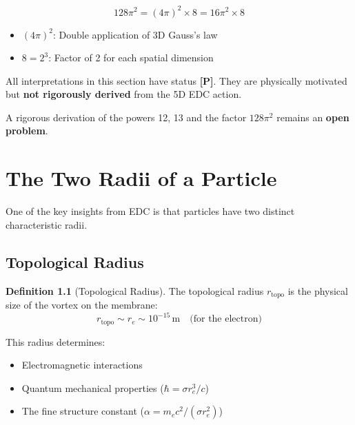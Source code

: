 \documentclass[12pt,a4paper,openany]{book}
\theoremstyle{definition}
\newtheorem{definition}{Definition}[chapter]
\theoremstyle{plain}
\theoremstyle{remark}
\newcommand{\re}{r_e}                      %
\newcommand{\rtopo}{r_{\text{topo}}}       %
\newcommand{\proposed}{\textcolor{proposedcolor}{\textbf{[P]}}}
\begin{document}
\begin{proposedbox}[Interpretation of $128\pi^2$]
\begin{equation}
128\pi^2 = (4\pi)^2 \times 8 = 16\pi^2 \times 8
\end{equation}

\begin{itemize}
    \item $(4\pi)^2$: Double application of 3D Gauss's law
    \item $8 = 2^3$: Factor of 2 for each spatial dimension
\end{itemize}
\end{proposedbox}

\begin{warningbox}
All interpretations in this section have status \proposed{}. They are physically motivated but \textbf{not rigorously derived} from the 5D EDC action.

A rigorous derivation of the powers 12, 13 and the factor $128\pi^2$ remains an \textbf{open problem}.
\end{warningbox}

\chapter{The Two Radii of a Particle}

One of the key insights from EDC is that particles have two distinct characteristic radii.

\section{Topological Radius}

\begin{definition}[Topological Radius]
The topological radius $\rtopo$ is the physical size of the vortex on the membrane:
\begin{equation}
\rtopo \sim \re \sim 10^{-15}\,\text{m} \quad \text{(for the electron)}
\label{eq:rtopo}
\end{equation}
\end{definition}

This radius determines:
\begin{itemize}
    \item Electromagnetic interactions
    \item Quantum mechanical properties ($\hbar = \sigma \re^3/c$)
    \item The fine structure constant ($\alpha = m_e c^2/(\sigma \re^2)$)
\end{itemize}
\end{document}
